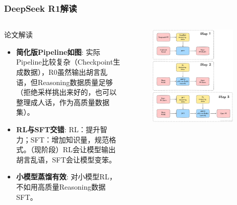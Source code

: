 \documentclass[8pt,aspectratio=169]{beamer}
\begin{document}
\begin{frame}
    \frametitle{DeepSeek R1解读}
    \begin{columns}[T]
        \begin{block}{论文解读}
            \begin{itemize}
                \item \textbf{简化版Pipeline如图}: 实际Pipeline比较复杂（Checkpoint生成数据），R0虽然输出胡言乱语，但Reasoning数据质量足够（拒绝采样挑出来好的，也可以整理成人话，作为高质量数据集）。
                \item \textbf{RL与SFT交错}: RL：提升智力；SFT：增加知识量，规范格式。（现阶段）RL会让模型输出胡言乱语，SFT会让模型变笨。
                \item \textbf{小模型蒸馏有效}: 对小模型RL，不如用高质量Reasoning数据SFT。
            \end{itemize}
        \end{block}
        
        \begin{figure}
            \includegraphics[width=0.9\textwidth]{GRPO/Open R1.png}
        \end{figure}
    \end{columns}
\end{frame}
\end{document}
